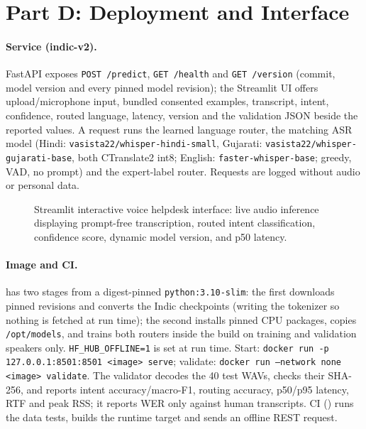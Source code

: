 \documentclass[sigconf,authordraft]{acmart}
\begin{document}
\section{Part D: Deployment and Interface}\label{sec:deploy}
\paragraph{Service (indic-v2).}
FastAPI exposes \texttt{POST /predict}, \texttt{GET /health} and \texttt{GET /version} (commit, model version and every pinned model revision); the Streamlit UI offers upload/microphone input, bundled consented examples, transcript, intent, confidence, routed language, latency, version and the validation JSON beside the reported values. A request runs the learned language router, the matching ASR model (Hindi: \texttt{vasista22/whisper-hindi-small}, Gujarati: \texttt{vasista22/whisper-gujarati-base}, both CTranslate2 int8; English: \texttt{faster-whisper-base}; greedy, VAD, no prompt) and the expert-label router. Requests are logged without audio or personal data.
\begin{figure}[!htbp]
\centering{}
\caption{Streamlit interactive voice helpdesk interface: live audio inference displaying prompt-free transcription, routed intent classification, confidence score, dynamic model version, and p50 latency.}
\label{fig:ui}
\end{figure}
\paragraph{Image and CI.}
 has two stages from a digest-pinned \texttt{python:3.10-slim}: the first downloads pinned revisions and converts the Indic checkpoints (writing the tokenizer so nothing is fetched at run time); the second installs pinned CPU packages, copies \texttt{/opt/models}, and trains both routers inside the build on training and validation speakers only. \texttt{HF\_HUB\_OFFLINE=1} is set at run time. Start: \texttt{docker run -p 127.0.0.1:8501:8501 <image> serve}; validate: \texttt{docker run --network none <image> validate}. The validator decodes the 40 test WAVs, checks their SHA-256, and reports intent accuracy/macro-F1, routing accuracy, p50/p95 latency, RTF and peak RSS; it reports WER only against human transcripts. CI () runs the data tests, builds the runtime target and sends an offline REST request.
\end{document}
